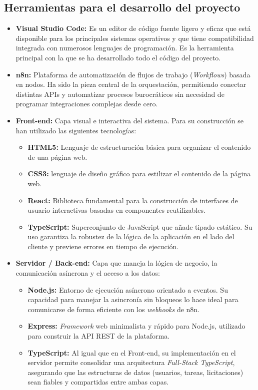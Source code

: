 \subsection{Herramientas para el desarrollo del proyecto}
\begin{itemize}
    \item \textbf{Visual Studio Code:} Es un editor de código fuente ligero y eficaz que está disponible para los principales sistemas operativos y que tiene compatibilidad integrada con numerosos lenguajes de programación. Es la herramienta principal con la que se ha desarrollado todo el código del proyecto.
    \item \textbf{n8n:} Plataforma de automatización de flujos de trabajo (\textit{Workflows}) basada en nodos. Ha sido la pieza central de la orquestación, permitiendo conectar distintas APIs y automatizar procesos burocráticos sin necesidad de programar integraciones complejas desde cero.
    \item \textbf{Front-end:} Capa visual e interactiva del sistema. Para su construcción se han utilizado las siguientes tecnologías:
    \begin{itemize}
        \item \textbf{HTML5:} Lenguaje de estructuración básica para organizar el contenido de una página web.
        \item \textbf{CSS3:} lenguaje de diseño gráfico para estilizar el contenido de la página web.
        \item \textbf{React:} Biblioteca fundamental para la construcción de interfaces de usuario interactivas basadas en componentes reutilizables.
        \item \textbf{TypeScript:} Superconjunto de JavaScript que añade tipado estático. Su uso garantiza la robustez de la lógica de la aplicación en el lado del cliente y previene errores en tiempo de ejecución.
    \end{itemize}
    \item \textbf{Servidor / Back-end:} Capa que maneja la lógica de negocio, la comunicación asíncrona y el acceso a los datos:
    \begin{itemize}
        \item \textbf{Node.js:} Entorno de ejecución asíncrono orientado a eventos. Su capacidad para manejar la asincronía sin bloqueos lo hace ideal para comunicarse de forma eficiente con los \textit{webhooks} de n8n.
        \item \textbf{Express:} \textit{Framework} web minimalista y rápido para Node.js, utilizado para construir la API REST de la plataforma.
        \item \textbf{TypeScript:} Al igual que en el Front-end, su implementación en el servidor permite consolidar una arquitectura \textit{Full-Stack TypeScript}, asegurando que las estructuras de datos (usuarios, tareas, licitaciones) sean fiables y compartidas entre ambas capas.
    \end{itemize}
    

\end{itemize}
